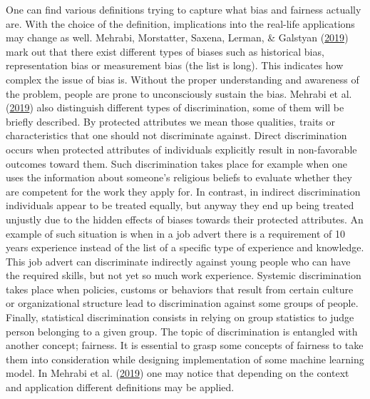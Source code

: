\documentclass[12pt,]{book}
\begin{document}
One can find various definitions trying to capture what bias and
fairness actually are. With the choice of the definition, implications
into the real-life applications may change as well. Mehrabi, Morstatter,
Saxena, Lerman, \& Galstyan
(\protect\hyperlink{ref-Mehrabi2019Survey}{2019}) mark out that there
exist different types of biases such as historical bias, representation
bias or measurement bias (the list is long). This indicates how complex
the issue of bias is. Without the proper understanding and awareness of
the problem, people are prone to unconsciously sustain the bias. Mehrabi
et al. (\protect\hyperlink{ref-Mehrabi2019Survey}{2019}) also
distinguish different types of discrimination, some of them will be
briefly described. By protected attributes we mean those qualities,
traits or characteristics that one should not discriminate against.
Direct discrimination occurs when protected attributes of individuals
explicitly result in non-favorable outcomes toward them. Such
discrimination takes place for example when one uses the information
about someone's religious beliefs to evaluate whether they are competent
for the work they apply for. In contrast, in indirect discrimination
individuals appear to be treated equally, but anyway they end up being
treated unjustly due to the hidden effects of biases towards their
protected attributes. An example of such situation is when in a job
advert there is a requirement of 10 years experience instead of the list
of a specific type of experience and knowledge. This job advert can
discriminate indirectly against young people who can have the required
skills, but not yet so much work experience. Systemic discrimination
takes place when policies, customs or behaviors that result from certain
culture or organizational structure lead to discrimination against some
groups of people. Finally, statistical discrimination consists in
relying on group statistics to judge person belonging to a given group.
The topic of discrimination is entangled with another concept; fairness.
It is essential to grasp some concepts of fairness to take them into
consideration while designing implementation of some machine learning
model. In Mehrabi et al.
(\protect\hyperlink{ref-Mehrabi2019Survey}{2019}) one may notice that
depending on the context and application different definitions may be
applied.
\end{document}
